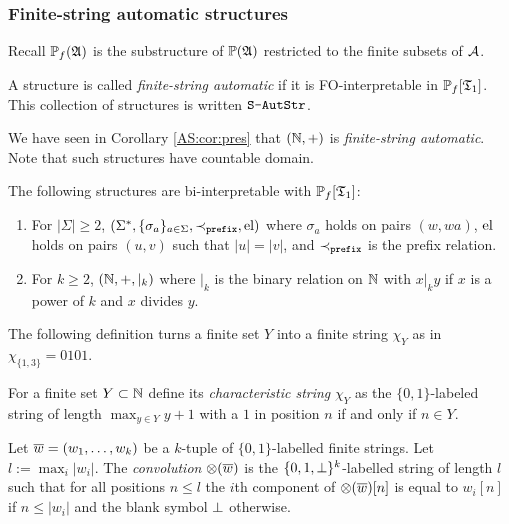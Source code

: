 \subsubsection*{Finite-string automatic structures}

Recall  ${\mathbb P}_f(\mathfrak{A})$ is the substructure of ${\mathbb P}(\mathfrak{A})$ restricted to the finite subsets of ${\mathcal A}$.

\begin{definition} 
A structure is called {\em finite-string automatic} if it is FO-interpretable in ${\mathbb P}_f[\mathfrak{T}_1]$. This collection of structures is written $\mbox{\tt S-AutStr}$.
\end{definition}

We have seen in Corollary \ref{AS:cor:pres} that $(\mathbb{N},+)$ is {\em finite-string automatic}. 
Note that such structures have countable domain. 

\begin{example} 
The following structures are bi-interpretable with ${\mathbb P}_f[\mathfrak{T}_1]$:
\begin{enumerate} 
\item For $|\Sigma| \geq 2$, $(\Sigma^\ast,\{\sigma_a\}_{a \in \Sigma},\prec_{\tt prefix},\text{el})$ 
where $\sigma_a$ holds on pairs $(w,wa)$, $\text{el}$ holds on pairs $(u,v)$ such that $|u|=|v|$, and $\prec_{\tt prefix}$ is the prefix relation.
\item For $k \geq 2$, $(\mathbb{N},+,|_k)$
where $|_k$ is the binary relation on $\mathbb{N}$ with $x |_k y$ if $x$ is a power of $k$ and $x$ divides $y$.
\end{enumerate}
\end{example}

The following definition turns a finite set $Y$ into a finite string $\chi_Y$ as in $\chi_{\{1,3\}} = 0101$.

\begin{definition}
For a finite set $Y \subset \mathbb{N}$ define
its {\em characteristic string} $\chi_Y$ as the $\{0,1\}$-labeled string of length $\max_{y \in Y} y + 1$ with a $1$ in position $n$ if and only if $n \in Y$.
\end{definition}


\begin{definition}
Let $\mbox{$\overline {w}$} = (w_1,\dots,w_k)$
be a $k$-tuple of $\{0,1\}$-labelled finite strings. Let $l:= \max_i |w_i|$.
The {\em convolution} $\otimes(\mbox{$\overline {w}$})$ is the $\{0,1,{\perp}\}^k$-labelled string of length $l$ such that for all positions $n \leq l$
the $i$th component of $\otimes(\mbox{$\overline {w}$})[n]$ is equal to $w_i[n]$ if $n \leq |w_i|$ and the blank symbol ${\perp}$ otherwise.
\end{definition} 


